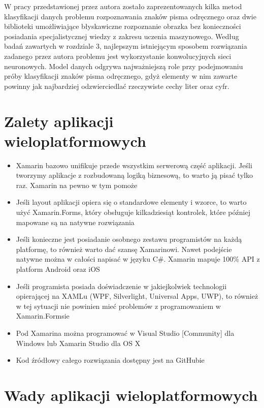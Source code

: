 \documentclass[brudnopis]{xmgr}
\begin{document}
W pracy przedstawionej przez autora zostało zaprezentowanych kilka metod klasyfikacji
danych problemu rozpoznawania znaków pisma odręcznego oraz dwie
biblioteki umożliwiające błyskawiczne rozpoznanie obrazka bez konieczności posiadania
specjalistycznej wiedzy z zakresu uczenia maszynowego.
Według badań zawartych w rozdziale 3, najlepszym istniejącym sposobem rozwiązania
zadanego przez autora problemu jest wykorzystanie konwolucyjnych sieci
neuronowych. Model danych odgrywa najważniejszą role przy podejmowaniu
próby klasyfikacji znaków pisma odręcznego, gdyż elementy w nim zawarte powinny
jak najbardziej odzwierciedlać rzeczywiste cechy liter oraz cyfr.

\section{Zalety aplikacji wieloplatformowych}

\begin{itemize}
\item
Xamarin bazowo unifikuje przede wszystkim serwerową część aplikacji. Jeśli tworzymy aplikacje z rozbudowaną logiką biznesową, to warto ją pisać tylko raz. Xamarin na pewno w tym pomoże
\item
Jeśli layout aplikacji opiera się o standardowe elementy i wzorce, to warto użyć Xamarin.Forms, który obsługuje kilkadziesiąt kontrolek, które później mapowane są na natywne rozwiązania
\item
Jeśli konieczne jest posiadanie osobnego zestawu programistów na każdą platformę, to również warto dać szansę Xamarinowi. Nawet podejście natywne można w całości napisać w języku C\#. Xamarin mapuje 100\% API z platform Android oraz iOS
\item
Jeśli programista posiada doświadczenie w jakiejkolwiek technologii opierającej na XAMLu (WPF, Silverlight, Universal Apps, UWP), to również w tej sytuacji nie powinien mieć problemów z programowaniem w Xamarin.Formsie
\item
Pod Xamarina można programować w Visual Studio [Community] dla Windows lub Xamarin Studio dla OS X
\item
Kod źródłowy całego rozwiązania dostępny jest na GitHubie
\end{itemize}

\section{Wady aplikacji wieloplatformowych}
\end{document}
